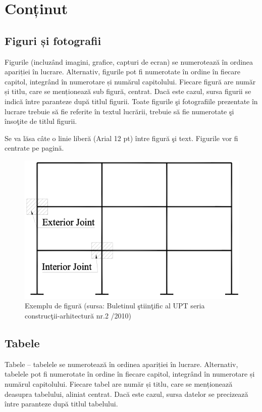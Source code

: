 \chapter{Conținut}
\thispagestyle{pagestyle}

\section{Figuri și fotografii}

Figurile (incluzând imagini, grafice, capturi de ecran) se numerotează în ordinea apariției în lucrare. Alternativ, figurile pot fi numerotate în ordine în fiecare capitol, integrând în numerotare și numărul capitolului. Fiecare figură are număr și titlu, care se menționează sub figură, centrat. Dacă este cazul, sursa figurii se indică între paranteze după titlul figurii. Toate figurile şi fotografiile prezentate în lucrare trebuie să fie referite în textul lucrării, trebuie să fie numerotate şi însoţite de titlul figurii.

Se va lăsa câte o linie liberă (Arial 12 pt) între figură şi text. Figurile vor fi centrate pe pagină.

\begin{figure}[h]
\centering
\includegraphics{images/Picture 1.png}
\caption{Exemplu de figură (sursa: Buletinul ştiinţific al UPT seria construcţii-arhitectură nr.2 /2010)}
\label{fig:fig2.1}
\end{figure}

\section{Tabele}

Tabele – tabelele se numerotează în ordinea apariției în lucrare. Alternativ, tabelele pot fi numerotate în ordine în fiecare capitol, integrând în numerotare și numărul capitolului. Fiecare tabel are număr și titlu, care se menționează deasupra tabelului, aliniat centrat. Dacă este cazul, sursa datelor se precizează între paranteze după titlul tabelului.

